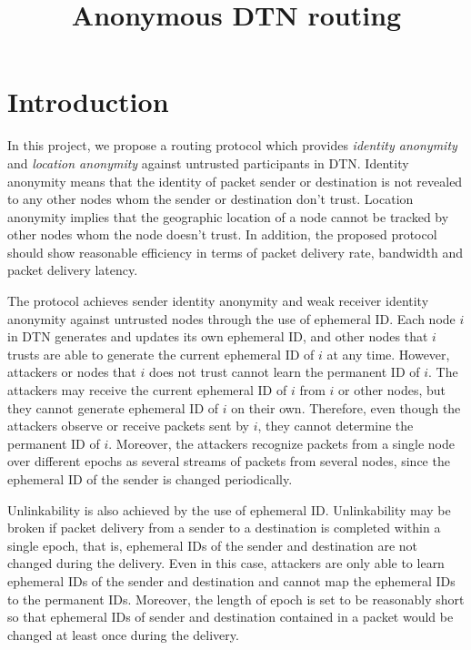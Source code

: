 \documentclass[11pt]{article}
\begin{document}
\title{Anonymous DTN routing}
\date{}
\maketitle

\section{Introduction}
In this project, we propose a routing protocol which provides \textit{identity anonymity} and \textit{location anonymity} against untrusted participants in DTN. 
Identity anonymity means that the identity of packet sender or destination is not revealed to any other nodes whom the sender or destination don't trust.  
Location anonymity implies that the geographic location of a node cannot be tracked by other nodes whom the node doesn't trust.  
In addition, the proposed protocol should show reasonable efficiency in terms of packet delivery rate, bandwidth and packet delivery latency.  

The protocol achieves sender identity anonymity and weak receiver identity anonymity against untrusted nodes through the use of ephemeral ID.  
Each node $i$ in DTN generates and updates its own ephemeral ID, and other nodes that $i$ trusts are able to generate the current ephemeral ID of $i$ at any time.  
However, attackers or nodes that $i$ does not trust cannot learn the permanent ID of $i$.  
The attackers may receive the current ephemeral ID of $i$ from $i$ or other nodes, but they cannot generate ephemeral ID of $i$ on their own.  
Therefore, even though the attackers observe or receive packets sent by $i$, they cannot determine the permanent ID of $i$.
Moreover, the attackers recognize packets from a single node over different epochs as several streams of packets from several nodes, since the ephemeral ID of the sender is changed periodically. 

Unlinkability is also achieved by the use of ephemeral ID.  Unlinkability may be broken if packet delivery from a sender to a destination is completed within a single epoch, that is, ephemeral IDs of the sender and destination are not changed during the delivery.  Even in this case, attackers are only able to learn ephemeral IDs of the sender and destination and cannot map the ephemeral IDs to the permanent IDs.  Moreover, the length of epoch is set to be reasonably short so that ephemeral IDs of sender and destination contained in a packet would be changed at least once during the delivery. 
\end{document}
